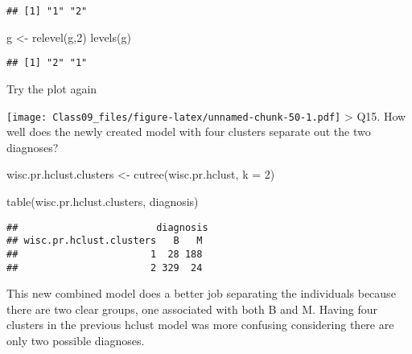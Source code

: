 \documentclass[
]{article}
\newenvironment{Shaded}{\begin{snugshade}}{\end{snugshade}}
\newcommand{\AttributeTok}[1]{\textcolor[rgb]{0.77,0.63,0.00}{#1}}
\newcommand{\DecValTok}[1]{\textcolor[rgb]{0.00,0.00,0.81}{#1}}
\newcommand{\FunctionTok}[1]{\textcolor[rgb]{0.00,0.00,0.00}{#1}}
\newcommand{\NormalTok}[1]{#1}
\newcommand{\OtherTok}[1]{\textcolor[rgb]{0.56,0.35,0.01}{#1}}
\newcommand{\SpecialCharTok}[1]{\textcolor[rgb]{0.00,0.00,0.00}{#1}}
\begin{document}
\begin{verbatim}
## [1] "1" "2"
\end{verbatim}

\begin{Shaded}
\begin{Highlighting}[]
\NormalTok{g }\OtherTok{\textless{}{-}} \FunctionTok{relevel}\NormalTok{(g,}\DecValTok{2}\NormalTok{)}
\FunctionTok{levels}\NormalTok{(g)}
\end{Highlighting}
\end{Shaded}

\begin{verbatim}
## [1] "2" "1"
\end{verbatim}

Try the plot again

\begin{Shaded}
\end{Shaded}

\texttt{[image: Class09\_files/figure-latex/unnamed-chunk-50-1.pdf]}
\textgreater{} Q15. How well does the newly created model with four
clusters separate out the two diagnoses?

\begin{Shaded}
\begin{Highlighting}[]
\NormalTok{wisc.pr.hclust.clusters }\OtherTok{\textless{}{-}} \FunctionTok{cutree}\NormalTok{(wisc.pr.hclust, }\AttributeTok{k =} \DecValTok{2}\NormalTok{)}
\end{Highlighting}
\end{Shaded}

\begin{Shaded}
\begin{Highlighting}[]
\FunctionTok{table}\NormalTok{(wisc.pr.hclust.clusters, diagnosis)}
\end{Highlighting}
\end{Shaded}

\begin{verbatim}
##                        diagnosis
## wisc.pr.hclust.clusters   B   M
##                       1  28 188
##                       2 329  24
\end{verbatim}

This new combined model does a better job separating the individuals
because there are two clear groups, one associated with both B and M.
Having four clusters in the previous hclust model was more confusing
considering there are only two possible diagnoses.
\end{document}
